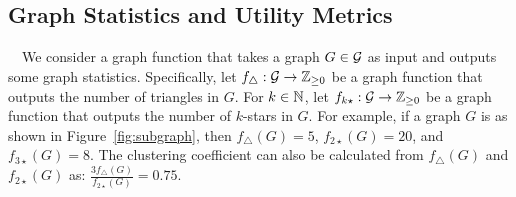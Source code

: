 


\subsection{Graph Statistics and Utility Metrics}
\label{sub:graph_statistics}

~~We consider a graph function that takes a graph $G \in \mathcal{G}$ as input and outputs some graph statistics. 
Specifically, 
let $f_\triangle: \mathcal{G} \rightarrow \mathbb{Z}_{\ge0}$ be a graph function that outputs the number of triangles in $G$. 
For $k \in \mathbb{N}$, let $f_{k\star}: \mathcal{G} \rightarrow \mathbb{Z}_{\ge0}$ be a graph function that outputs the number of $k$-stars in $G$. 
For example, if a graph $G$ is as shown in Figure~\ref{fig:subgraph}, then $f_\triangle(G) = 5$, $f_{2\star}(G) = 20$, and $f_{3\star}(G) = 8$. The clustering coefficient can also be calculated from $f_\triangle(G)$ and $f_{2\star}(G)$ as: $\frac{3 f_\triangle(G)}{f_{2\star}(G)} = 0.75$. 


